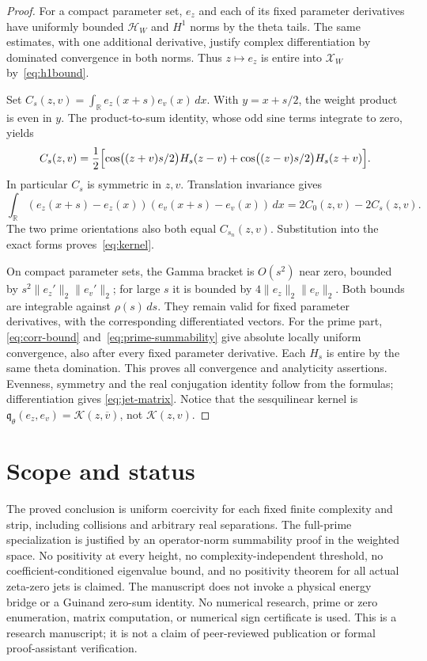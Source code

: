 \documentclass[11pt]{article}
\theoremstyle{definition}
\theoremstyle{remark}
\newcommand{\R}{\mathbb R}
\newcommand{\HH}{\mathcal H_W}
\newcommand{\XX}{\mathcal X_W}
\newcommand{\qth}{\mathfrak q_\theta}
\newcommand{\norm}[1]{\lVert #1\rVert}
\newcommand{\dd}{\,dx}
\begin{document}
\begin{proof}
For a compact parameter set, $e_z$ and each of its fixed parameter
derivatives have uniformly bounded $\HH$ and $H^1$ norms by the theta
tails. The same estimates, with one additional derivative, justify
complex differentiation by dominated convergence in both norms. Thus
$z\mapsto e_z$ is entire into $\XX$ by~\eqref{eq:h1bound}.

Set $C_s(z,v)=\int_\R e_z(x+s)e_v(x)\dd$. With $y=x+s/2$, the weight
product is even in $y$. The product-to-sum identity, whose odd sine terms
integrate to zero, yields
\begin{equation}\label{eq:Cs}
 C_s(z,v)=\frac12\Bigl[
 \cos\bigl((z+v)s/2\bigr)H_s(z-v)
 +\cos\bigl((z-v)s/2\bigr)H_s(z+v)\Bigr].
\end{equation}
In particular $C_s$ is symmetric in $z,v$. Translation invariance gives
\[
 \int_\R(e_z(x+s)-e_z(x))(e_v(x+s)-e_v(x))\dd
 =2C_0(z,v)-2C_s(z,v).
\]
The two prime orientations also both equal $C_{s_n}(z,v)$.
Substitution into the exact forms proves~\eqref{eq:kernel}.

On compact parameter sets, the Gamma bracket is $O(s^2)$ near zero,
bounded by $s^2\norm{e_z'}_2\norm{e_v'}_2$; for large $s$ it is bounded
by $4\norm{e_z}_2\norm{e_v}_2$. Both bounds are integrable against
$\rho(s)\,ds$. They remain valid for fixed parameter derivatives, with
the corresponding differentiated vectors. For the prime part,
\eqref{eq:corr-bound} and~\eqref{eq:prime-summability} give absolute
locally uniform convergence, also after every fixed parameter derivative.
Each $H_s$ is entire by the same theta domination. This proves all
convergence and analyticity assertions. Evenness, symmetry and the real
conjugation identity follow from the formulas; differentiation gives
\eqref{eq:jet-matrix}. Notice that the sesquilinear kernel is
$\qth(e_z,e_v)=\mathcal K(z,\overline v)$, not $\mathcal K(z,v)$.
\end{proof}

\section*{Scope and status}
The proved conclusion is uniform coercivity for each fixed finite
complexity and strip, including collisions and arbitrary real separations.
The full-prime specialization is justified by an operator-norm summability
proof in the weighted space. No positivity at every height, no
complexity-independent threshold, no coefficient-conditioned eigenvalue
bound, and no positivity theorem for all actual zeta-zero jets is claimed.
The manuscript does not invoke a physical energy bridge or a Guinand
zero-sum identity. No numerical research, prime or zero enumeration,
matrix computation, or numerical sign certificate is used. This is a
research manuscript; it is not a claim of peer-reviewed publication or
formal proof-assistant verification.
\end{document}
